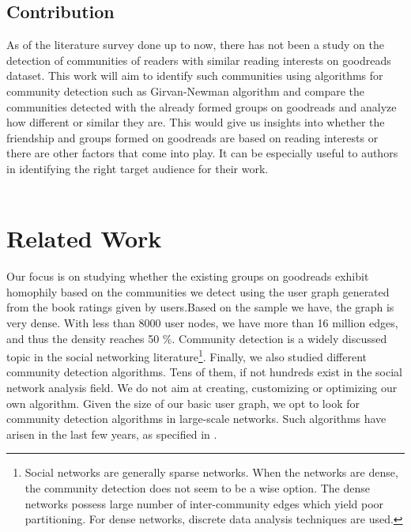 \documentclass[11pt]{article}
\begin{document}
\subsection{Contribution}
As of the literature survey done up to now, there has not been a study on the detection of communities of readers with similar reading interests on goodreads dataset.
This work will aim to identify such communities using algorithms for community detection such as Girvan-Newman algorithm and compare the communities detected with the already formed groups on goodreads and analyze how different or similar they are.
This would give us insights into whether the friendship and groups formed on goodreads are based on reading interests or there are other factors that come into play. It can be especially useful to authors in identifying the right target audience for their work. \\\\

\section{Related Work}
Our focus is on studying whether the existing groups on goodreads exhibit homophily based on the communities we detect using the user graph generated from the book ratings given by users.Based on the sample we have, the graph is very dense.
With less than 8000 user nodes, we have more than 16 million edges, and thus the density reaches 50 \%.
Community detection is a widely discussed topic in the social networking literature\footnote{Social networks are generally sparse networks. When the networks are dense, the community detection does not seem to be a wise option. The dense networks possess large number of inter-community edges which yield poor partitioning. For dense networks, discrete data analysis techniques are used.}\cite{clauset}.
Finally, we also studied different community detection algorithms. Tens of them, if not hundreds exist in the social network analysis field. We do not aim at creating, customizing or optimizing our own algorithm. Given the size of our basic user graph, we opt to look for community detection algorithms in large-scale networks. Such algorithms have arisen in the last few years, as specified in \cite{survey}.
\end{document}

